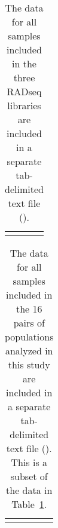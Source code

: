 \begin{table}[htbp]
\sffamily
\captionsetup{name=Table S, labelformat=noSpace}
\caption{
    The data for all samples included in the three RADseq libraries are
    included in a separate tab-delimited text file
    ().
}
\centering
\begin{tabular}{ l l }
     &  \\
\end{tabular}
\label{table:reftosampledata}
\end{table}

\begin{table}[htbp]
\sffamily
\captionsetup{name=Table S, labelformat=noSpace}
\caption{
    The data for all samples included in the 16 pairs of populations analyzed
    in this study are included in a separate tab-delimited text file
    ().
    This is a subset of the data in Table~\ref{table:reftosampledata}.
}
\centering
\begin{tabular}{ l l }
     &  \\
\end{tabular}
\label{table:reftopairsampledata}
\end{table}





